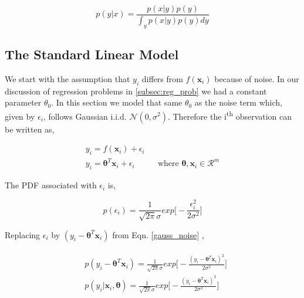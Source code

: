 \documentclass[english]{tktltiki}
\begin{document}
\begin{equation}
p(y|x) = \frac{p(x|y)p(y)}{\int_y{p(x|y)p(y)dy}}
\end{equation}

\subsection{The Standard Linear Model}

We start with the assumption that $y_i$ differs from $f(\mathbf{x}_i)$ because of noise. In our discussion of regression problems in \ref{subsec:reg_prob} we had a constant parameter $\theta_0$. In this section we model that same $\theta_0$ as the noise term which, given by $\epsilon_i$, follows Gaussian i.i.d. $\mathcal{N}(0, \sigma ^2)$. Therefore the i\textsuperscript{th} observation can be written as,

\begin{eqnarray}
\label{eqn:standard_linear_model}
y_i = f(\mathbf{x}_i) + \epsilon_i \nonumber \\
y_i = \boldsymbol\theta ^T \mathbf{x}_i + \epsilon_i && \text{where $\boldsymbol\theta, \mathbf{x}_i \in \mathcal{R}^m$}
\label{gauss_noise}
\end{eqnarray}

The PDF associated with $\epsilon_i$ is,

\begin{equation}
p(\epsilon_i) = \frac{1}{\sqrt{2 \pi} \sigma} exp \Big[-\frac{\epsilon_i^2}{2 \sigma^2} \Big]
\end{equation}


Replacing $\epsilon_i$ by $(y_i - \boldsymbol\theta ^T \mathbf{x}_i)$ from Eqn. \ref{gauss_noise} ,

\begin{eqnarray}
\begin{split}
	&p(y_i - \boldsymbol\theta ^T \mathbf{x}_i) = \frac{1}{\sqrt{2 \pi} \sigma} exp \Big[-\frac{(y_i - \boldsymbol\theta ^T \mathbf{x}_i)^2}{2 \sigma^2} \Big] \\
	&p(y_i | \mathbf{x}_i, \boldsymbol\theta) = \frac{1}{\sqrt{2 \pi} \sigma} exp \Big[-\frac{(y_i - \boldsymbol\theta ^T \mathbf{x}_i)^2}{2 \sigma^2} \Big]
\end{split}
\end{eqnarray}
\end{document}
